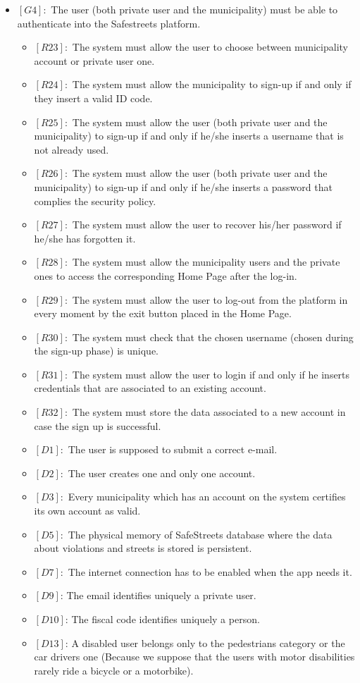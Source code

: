 \documentclass[titlepage]{article}
\begin{document}
\begin{itemize}
 
 \item $[G4]:$ The user (both private user and the municipality) must be able to authenticate into the Safestreets platform.
 \begin{itemize}
 \item $[R23]:$ The system must allow the user to choose between municipality account or private user one.
 \item $[R24]:$ The system must allow the municipality to sign-up if and only if they insert a valid ID code.
 \item $[R25]:$ The system must allow the user (both private user and the municipality) to sign-up if and only if he/she inserts a username that is not already used.
 \item $[R26]:$ The system must allow the user (both private user and the municipality) to sign-up if and only if he/she inserts a password that complies the security policy.
 \item $[R27]:$ The system must allow the user to recover his/her password if he/she has forgotten it.
 \item $[R28]:$ The system must allow the municipality users and the private ones to access the corresponding Home Page after the log-in.
 \item $[R29]:$ The system must allow the user to log-out from the platform in every moment by the exit button placed in the Home Page.
 \item $[R30]:$ The system must check that the chosen username (chosen during the sign-up phase) is unique. 
 \item $[R31]:$ The system must allow the user to login if and only if he inserts credentials that are associated to an existing account.
 \item $[R32]:$ The system must store the data associated to a new account in case the sign up is successful.
 \item $[D1]:$ The user is supposed to submit a correct e-mail.
 \item $[D2]:$ The user creates one and only one account.
 \item $[D3]:$ Every municipality which has an account on the system certifies its own account as valid.
 \item $[D5]:$ The physical memory of SafeStreets database where the data about violations and streets is stored is persistent.
 \item $[D7]:$ The internet connection has to be enabled when the app needs it.
 \item $[D9]$: The email identifies uniquely a private user.
 \item $[D10]$: The fiscal code identifies uniquely a person.
 \item $[D13]$: A disabled user belongs only to the pedestrians category or the car drivers one (Because we suppose that the users with motor disabilities rarely ride a bicycle or a motorbike).
 

\end{itemize}
\end{itemize}
\end{document}
